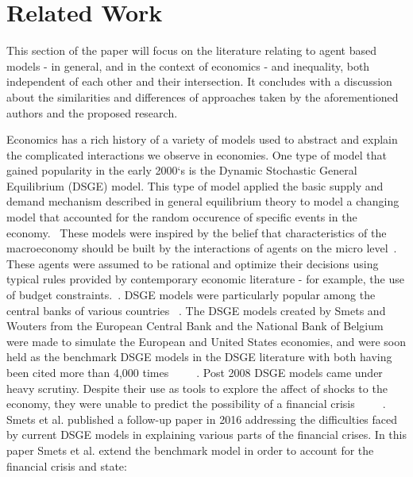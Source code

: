 \documentclass[11pt]{article}
\begin{document}
\section{Related Work}
\label{sec:relatedwork}

This section of the paper will focus on the literature relating to agent based
models - in general, and in the context of economics - and inequality, both
independent of each other and their intersection. It concludes with a discussion
about the similarities and differences of approaches taken by the aforementioned
authors and the proposed research.

Economics has a rich history of a variety of models used to abstract and explain
the complicated interactions we observe in economies. One type of model that
gained popularity in the early 2000`s is the Dynamic Stochastic General Equilibrium
(DSGE) model. This type of model applied the basic supply and demand mechanism
described in general equilibrium theory to model a changing model that accounted
for the random occurence of specific events in the economy.~\cite{Haldane-history-paper}
These models were inspired by the belief that characteristics of the macroeconomy
should be built by the interactions of agents on the micro level~\cite{Haldane-history-paper}.
These agents were assumed to be rational and optimize their decisions using typical
rules provided by contemporary economic literature - for example, the use of
budget constraints.~\cite{Haldane-history-paper}. DSGE models were particularly
 popular among the central banks of various countries ~\cite{Smets-challenges-paper}.
 The DSGE models created by Smets and Wouters from the European Central Bank and
 the National Bank of Belgium were made to simulate the European and United States
 economies, and were soon held as the benchmark DSGE models in the DSGE literature
 with both having been cited more than 4,000 times ~\cite{Smets-euro-paper} ~\cite{Smets-us-paper} ~\cite{Smets-challenges-paper}.
  Post 2008 DSGE models came under heavy scrutiny. Despite their use as tools to
  explore the affect of shocks to the economy, they were unable to predict the
  possibility of a financial crisis ~\cite{Smets-euro-paper} ~\cite{Smets-us-paper} ~\cite{Smets-challenges-paper}.
  Smets et al. published a follow-up paper in 2016 addressing the difficulties
   faced by current DSGE models in explaining various parts of the financial crises.
   In this paper Smets et al. extend the benchmark model in order to account
   for the financial crisis and state:
\end{document}
